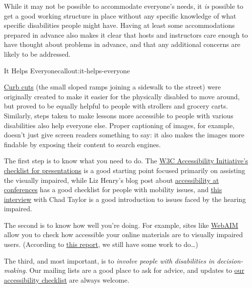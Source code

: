 While it may not be possible to accommodate everyone's needs, it
\emph{is} possible to get a good working structure in place without any
specific knowledge of what specific disabilities people might have.
Having at least some accommodations prepared in advance also makes it
clear that hosts and instructors care enough to have thought about
problems in advance, and that any additional concerns are likely to be
addressed.

\begin{callout}{It Helps Everyone}{callout:it-helps-everyone}

\href{https://en.wikipedia.org/wiki/Curb\_cut}{Curb cuts} (the small
sloped ramps joining a sidewalk to the street) were originally created
to make it easier for the physically disabled to move around, but proved
to be equally helpful to people with strollers and grocery carts.
Similarly, steps taken to make lessons more accessible to people with
various disabilities also help everyone else. Proper captioning of
images, for example, doesn't just give screen readers something to say:
it also makes the images more findable by exposing their content to
search engines.
\end{callout}

The first step is to know what you need to do. The
\href{http://www.w3.org/WAI/training/accessible}{W3C Accessibility
Initiative's checklist for presentations} is a good starting point
focused primarily on assisting the visually impaired, while Liz Henry's
blog post about
\href{https://modelviewculture.com/pieces/unlocking-the-invisible-elevator-accessibility-at-tech-conferences}{accessibility
at conferences} has a good checklist for people with mobility issues,
and
\href{https://modelviewculture.com/pieces/qa-making-tech-events-accessible-to-the-deaf-community}{this
interview} with Chad Taylor is a good introduction to issues faced by
the hearing impaired.

The second is to know how well you're doing. For example, sites like
\href{http://webaim.org/}{WebAIM} allow you to check how accessible your
online materials are to visually impaired users. (According to
\href{http://wave.webaim.org/report\#/software-carpentry.org}{this
report}, we still have some work to do\ldots{})

The third, and most important, is to \emph{involve people with
disabilities in decision-making}. Our mailing lists are a good place to
ask for advice, and updates to
\href{http://software-carpentry.org/workshops/checklists/accessibility/}{our
accessibility checklist} are always welcome.

